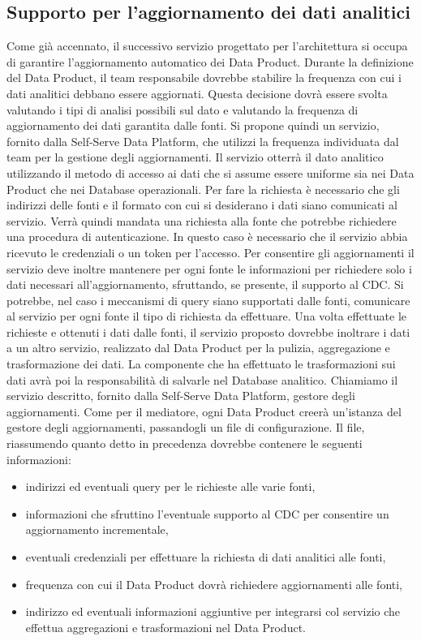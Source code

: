 \documentclass[12pt]{report}
\begin{document}
\subsection{Supporto per l'aggiornamento dei dati analitici}
Come già accennato, il successivo servizio progettato per l'architettura si occupa di garantire l'aggiornamento automatico dei Data Product.
Durante la definizione del Data Product, il team responsabile dovrebbe stabilire la frequenza con cui i dati analitici debbano essere aggiornati.
Questa decisione dovrà essere svolta valutando i tipi di analisi possibili sul dato e valutando la frequenza di aggiornamento dei dati garantita dalle fonti. 
Si propone quindi un servizio, fornito dalla Self-Serve Data Platform, che utilizzi la frequenza individuata dal team per la gestione degli aggiornamenti.
Il servizio otterrà il dato analitico utilizzando il metodo di accesso ai dati che si assume essere uniforme sia nei Data Product che nei Database operazionali.
Per fare la richiesta è necessario che gli indirizzi delle fonti e il formato con cui si desiderano i dati siano comunicati al servizio.
Verrà quindi mandata una richiesta alla fonte che potrebbe richiedere una procedura di autenticazione. 
In questo caso è necessario che il servizio abbia ricevuto le credenziali o un token per l'accesso.
Per consentire gli aggiornamenti il servizio deve inoltre mantenere per ogni fonte le informazioni per richiedere solo i dati necessari all'aggiornamento, sfruttando, se presente, il supporto al CDC.
Si potrebbe, nel caso i meccanismi di query siano supportati dalle fonti, comunicare al servizio per ogni fonte il tipo di richiesta da effettuare. 
Una volta effettuate le richieste e ottenuti i dati dalle fonti, il servizio proposto dovrebbe inoltrare i dati a un altro servizio, realizzato dal Data Product per la pulizia, aggregazione e trasformazione dei dati. 
La componente che ha effettuato le trasformazioni sui dati avrà poi la responsabilità di salvarle nel Database analitico.
Chiamiamo il servizio descritto, fornito dalla Self-Serve Data Platform, gestore degli aggiornamenti.
Come per il mediatore, ogni Data Product creerà un'istanza del gestore degli aggiornamenti, passandogli un file di configurazione.
Il file, riassumendo quanto detto in precedenza dovrebbe contenere le seguenti informazioni: 
\begin{itemize}
    \item indirizzi ed eventuali query per le richieste alle varie fonti,
    \item informazioni che sfruttino l'eventuale supporto al CDC per consentire un aggiornamento incrementale,
    \item eventuali credenziali per effettuare la richiesta di dati analitici alle fonti,
    \item frequenza con cui il Data Product dovrà richiedere aggiornamenti alle fonti, 
    \item indirizzo ed eventuali informazioni aggiuntive per integrarsi col servizio che effettua aggregazioni e trasformazioni nel Data Product.
\end{itemize}
\end{document}

